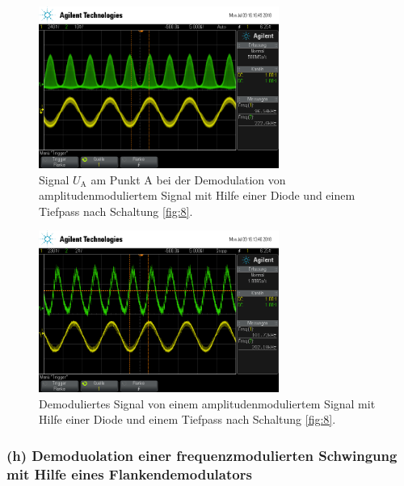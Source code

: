 \begin{figure}
  \centering
  \includegraphics[width=0.7\textwidth]{osci/amp_demod_diode_A.png}
  \caption{Signal $U_{\text{A}}$ am Punkt A bei der Demodulation von amplitudenmoduliertem Signal mit Hilfe einer
  Diode und einem Tiefpass nach Schaltung \ref{fig:8}.}
  \label{fig:diode_punkt_A}
\end{figure}


\begin{figure}
  \centering
  \includegraphics[width=0.7\textwidth]{osci/amp_demod_diode.png}
  \caption{Demoduliertes Signal von einem amplitudenmoduliertem Signal mit Hilfe einer
  Diode und einem Tiefpass nach Schaltung \ref{fig:8}.}
  \label{fig:diode_demod_amp}
\end{figure}



\subsubsection{(h) Demoduolation einer frequenzmodulierten Schwingung
mit Hilfe eines Flankendemodulators}
\label{subsubsec:auswertung_h}

